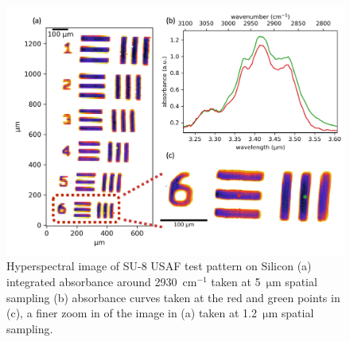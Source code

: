 \documentclass{optica-article}
\begin{document}
\begin{figure}[h]
    \centering
    \includegraphics[width=\linewidth]{su8_image.png}
    \caption{Hyperspectral image of SU-8 USAF test pattern on Silicon (a) integrated absorbance around \mbox{2930 $\mathrm{cm^{-1}}$} taken at \mbox{5 $\mathrm{\mu m}$} spatial sampling (b) absorbance curves taken at the red and green points in (c), a finer zoom in of the image in (a) taken at \mbox{1.2 $\mathrm{\mu m}$} spatial sampling.}
    \label{fig:su8}
\end{figure}
\end{document}
